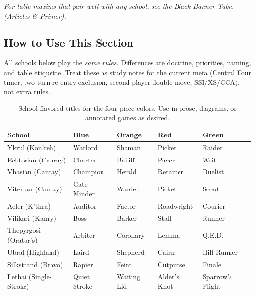 \documentclass[11pt]{article}
\renewcommand{\arraystretch}{1.15}
\begin{document}
\vspace{0.35em}
\noindent\textit{\color{muted}For table maxims that pair well with any school, see the \emph{Black Banner Table (Articles \& Primer)}.}

\subsection*{How to Use This Section}
All schools below play the \emph{same rules}. Differences are doctrine, priorities, naming, and table etiquette. Treat these as study notes for the current meta (Central Four timer, two-turn re-entry exclusion, second-player double-move, SSI/XS/CCA), not extra rules.


\begin{table}[h]
\centering
\small
\setlength{\tabcolsep}{6pt}
\renewcommand{\arraystretch}{1.15}
\begin{tabular}{@{}lllll@{}}
\toprule
\textbf{School} & \textbf{Blue} & \textbf{Orange} & \textbf{Red} & \textbf{Green}\\
\midrule
Ykrul (Kon'reh)      & Warlord        & Shaman        & Picket      & Raider\\
Ecktorian (Canray)   & Charter        & Bailiff       & Paver       & Writ\\
Vhasian (Canray)     & Champion       & Herald        & Retainer    & Duelist\\
Viterran (Canray)    & Gate-Minder    & Warden        & Picket      & Scout\\
Aeler (K’thra)       & Auditor        & Factor        & Roadwright    & Courier\\
Vilikari (Kanry)     & Boss      & Barker        & Stall     & Runner\\
Thepyrgosi (Orator’s)& Arbiter        & Corollary     & Lemma       & Q.E.D.\\
Ubral (Highland)     & Laird          & Shepherd      & Cairn       & Hill-Runner\\
Silkstrand (Bravo)   & Rapier         & Feint         & Cutpurse    & Finale\\
Lethai (Single-Stroke) & Quiet Stroke & Waiting Lid & Alder’s Knot & Sparrow’s Flight\\
\bottomrule
\end{tabular}
\caption{School-flavored titles for the four piece colors. Use in prose, diagrams, or annotated games as desired.}
\end{table}
\end{document}
